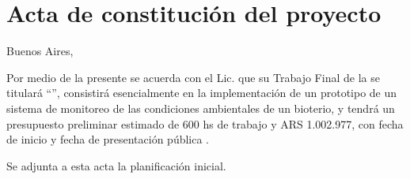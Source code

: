 \documentclass[
11pt, %
]{charter}
\begin{document}
\section*{Acta de constitución del proyecto}
\label{sec:acta}

\begin{flushright}
Buenos Aires, \fechaInicioName
\end{flushright}

\vspace{2cm}


Por medio de la presente se acuerda con el Lic. \authorname\hspace{1px} que su Trabajo Final de la \degreename\hspace{1px} se titulará ``\ttitle'', consistirá esencialmente en {la implementación de un prototipo de un sistema de monitoreo de las condiciones ambientales de un bioterio}, y tendrá un presupuesto preliminar estimado de {600} hs de trabajo y {ARS 1.002.977}, con fecha de inicio \fechaInicioName\hspace{1px} y fecha de presentación pública \fechaFinalName.

Se adjunta a esta acta la planificación inicial.

\vfill
\end{document}
